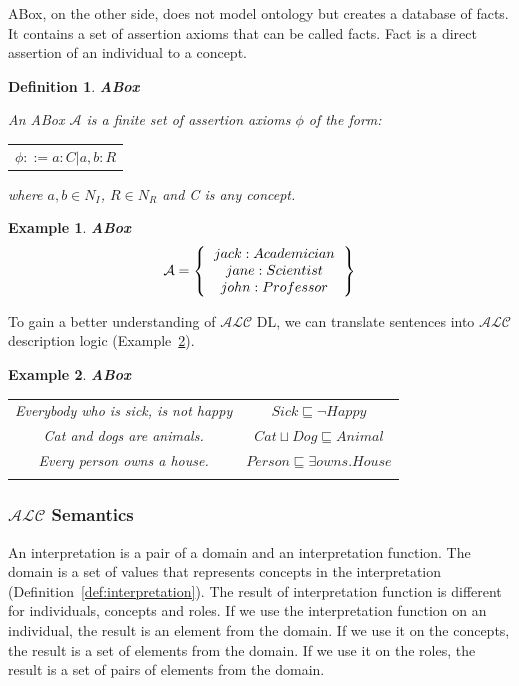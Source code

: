\documentclass[12pt,a4paper]{article}
\newtheorem{definition}{Definition}[subsection]
\newtheorem{example}{Example}[subsection]
\begin{document}
ABox, on the other side, does not model ontology but creates a database of facts. It contains a set of assertion axioms that can be called facts. Fact is a direct assertion of an individual to a concept.

\begin{definition}{\textbf{ABox}}
	\label{def:abox}
	
    An ABox $\mathcal{A}$ is a finite set of assertion axioms $\phi$ of the form:
	\begin{table}[H]
		\centering
		\begin{tabular}{c}
			$ \phi ::= a:C | a,b:R $
		\end{tabular}
	\end{table}
	where $a,b \in N_{I}$, $R \in N_{R}$ and C is any concept.
\end{definition}

\begin{example}{\textbf{ABox}}
	\[ 
	\mathcal{A} = \left\{
	\begin{tabular}{c c}
	$jack : Academician$ \\
	$jane : Scientist$ \\
	$john : Professor$ \\
	\end{tabular}
	\right \}
	\]
\end{example}

To gain a better understanding of $\mathcal{ALC}$ DL, we can translate sentences into $\mathcal{ALC}$ description logic (Example~\ref{example:sentences}).

\begin{example}{\textbf{ABox}}
	\label{example:sentences}
	
	\begin{table}[H]
		\centering
		\begin{tabular}{c c}
			Everybody who is sick, is not happy & $Sick \sqsubseteq \neg Happy$ \\ \addlinespace[0.4cm]
			Cat and dogs are animals. & $Cat \sqcup Dog \sqsubseteq Animal$ \\ \addlinespace[0.4cm]
			Every person owns a house. & $Person \sqsubseteq \exists owns.House$ \\	\addlinespace[0.4cm]
		\end{tabular}		
	\end{table}
\end{example}

\subsubsection{$\mathcal{ALC}$ Semantics}
An interpretation is a pair of a domain and an interpretation function. The domain is a set of values that represents concepts in the interpretation (Definition~\ref{def:interpretation}). The result of interpretation function is different for individuals, concepts and roles. If we use the interpretation function on an individual, the result is an element from the domain. If we use it on the concepts, the result is a set of elements from the domain. If we use it on the roles, the result is a set of pairs of elements from the domain.
\end{document}
